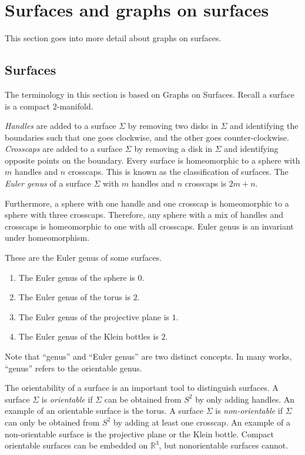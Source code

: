 \section{Surfaces and graphs on surfaces}

This section goes into more detail about graphs on surfaces. 

\subsection{Surfaces}

The terminology in this section is based on \textcite{moharGraphsSurfaces2001} Graphs on Surfaces. Recall a surface is a compact $2$-manifold. 

\textit{Handles} are added to a surface \(\Sigma\) by removing two disks in \(\Sigma\) and identifying the boundaries such that one goes clockwise, and the other goes counter-clockwise. \textit{Crosscaps} are added to a surface $\Sigma$ by removing a disk in \(\Sigma\) and identifying opposite points on the boundary. Every surface is homeomorphic to a sphere with $m$ handles and $n$ crosscaps. This is known as the classification of surfaces. The \textit{Euler genus} of a surface \(\Sigma\) with $m$ handles and $n$ crosscaps is $2m + n$.

Furthermore, a sphere with one handle and one crosscap is homeomorphic to a sphere with three crosscaps. Therefore, any sphere with a mix of handles and crosscaps is homeomorphic to one with all crosscaps. Euler genus is an invariant under homeomorphism. 

These are the Euler genus of some surfaces.
\begin{enumerate}
	\item The Euler genus of the sphere is \(0\).
	\item The Euler genus of the torus is \(2\).
	\item The Euler genus of the projective plane is \(1\). 
	\item The Euler genus of the Klein bottles is \(2\). 
\end{enumerate}

Note that ``genus'' and ``Euler genus'' are two distinct concepts. In many works, ``genus'' refers to the orientable genus. 

The orientability of a surface is an important tool to distinguish surfaces. A surface \(\Sigma\) is \textit{orientable} if \(\Sigma\) can be obtained from \(S^2\) by only adding handles. An example of an orientable surface is the torus. A surface \(\Sigma\) is \textit{non-orientable} if \(\Sigma\) can only be obtained from \(S^2\) by adding at least one crosscap. An example of a non-orientable surface is the projective plane or the Klein bottle. Compact orientable surfaces can be embedded on $\mathbb{R}^3$, but nonorientable surfaces cannot.

